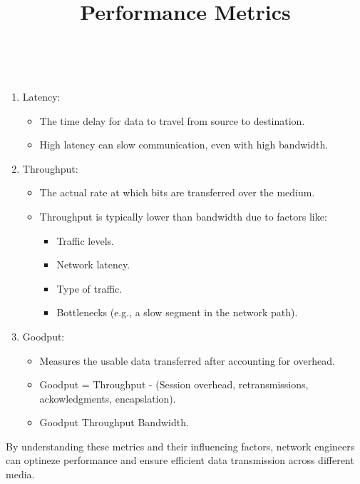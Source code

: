 \documentclass[a4paper,11pt]{article}
\begin{document}
\title{Performance Metrics}\\
\begin{enumerate}
    \item Latency:\\
    \begin{itemize}
        \item The time delay for data to travel from source to destination.\\
        \item High latency can slow communication, even with high bandwidth.\\
    \end{itemize}
    \item Throughput:\\
    \begin{itemize}
        \item The actual rate at which bits are transferred over the medium.\\
        \item Throughput is typically lower than bandwidth due to factors like:\\
        \begin{itemize}
            \item Traffic levels.\\
            \item Network latency.\\
            \item Type of traffic.\\
            \item Bottlenecks (e.g., a slow segment in the network path).
        \end{itemize}
    \end{itemize}
    \item Goodput:\\
    \begin{itemize}
        \item Measures the usable data transferred after accounting for overhead.\\
        \item Goodput = Throughput - (Session overhead, retransmissions, ackowledgments, encapslation).\\
        \item Goodput \< Throughput \< Bandwidth.\\
    \end{itemize}
\end{enumerate}
By understanding these metrics and their influencing factors, network engineers can optineze performance and ensure efficient data transmission across different media.\\
\end{document}

